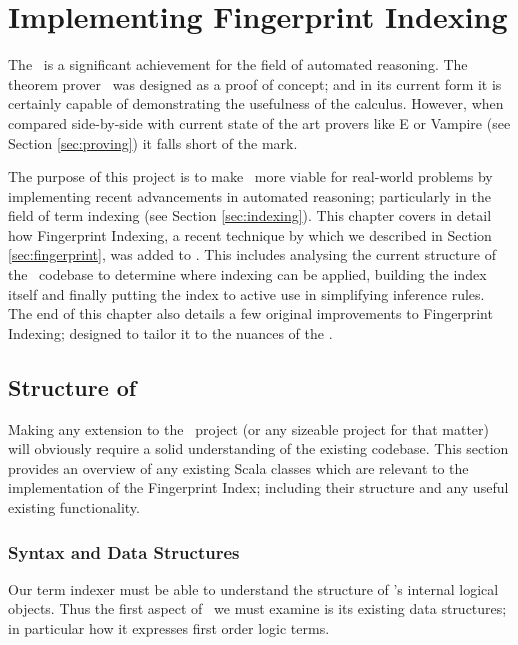 
\chapter{Implementing Fingerprint Indexing}
\label{cha:method}

The \HSWAC\ is a significant achievement for the field of automated reasoning.
The theorem prover \beagle\ was designed as a proof of concept; and in its
current form it is certainly capable of demonstrating the
usefulness of the calculus. However, when compared side-by-side with current
state of the art provers like E or Vampire (see Section \ref{sec:proving}) it falls short
of the mark.

The purpose of this project is to make \beagle\ more viable for real-world problems
by implementing recent advancements in automated reasoning; particularly in the
field of term indexing (see Section \ref{sec:indexing}). This chapter covers in
detail how Fingerprint Indexing, a recent technique by  which we described
in Section \ref{sec:fingerprint}, was added to \beagle. This includes analysing
the current structure of the \beagle\ codebase to determine where indexing can
be applied, building the index itself and finally putting the index to active use
in simplifying inference rules. The end of this chapter also details a few
original improvements to Fingerprint Indexing; designed to tailor it to the nuances
of the \HSWAC.

\section{Structure of \Beagle}
\label{sec:initial}

Making any extension to the \beagle\ project (or any sizeable project
for that matter) will obviously require a solid
understanding of the existing codebase. This section provides an overview
of any existing Scala classes which are relevant to the implementation of the Fingerprint Index;
including their structure and any useful existing functionality. 

\subsection{Syntax and Data Structures}

Our term indexer must be able to understand the structure of \beagle's internal
logical objects. Thus the first aspect of \beagle\ we must examine is its existing data structures;
in particular how it expresses first order logic terms.

